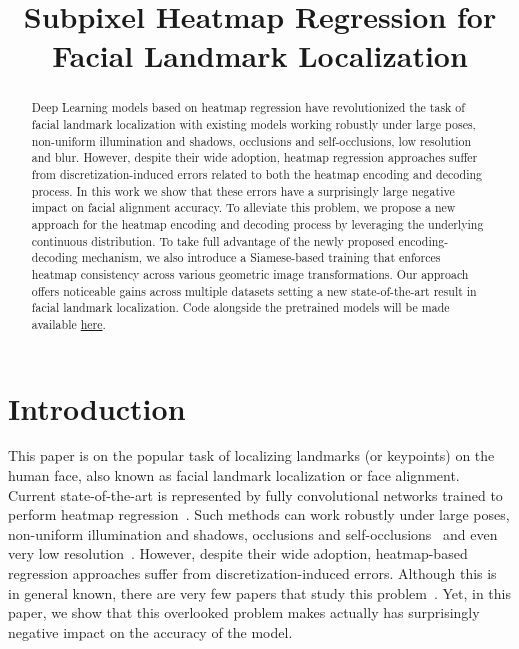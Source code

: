 \documentclass{bmvc2k}
\title{Subpixel Heatmap Regression for Facial Landmark Localization}
\begin{document}
\maketitle

\begin{abstract}
   
   Deep Learning models based on heatmap regression have revolutionized the task of facial landmark localization with existing models working robustly under large poses, non-uniform illumination and shadows, occlusions and self-occlusions, low resolution and blur. However, despite their wide adoption, heatmap regression approaches suffer from discretization-induced errors related to both the heatmap encoding and decoding process. In this work we show that these errors have a surprisingly large negative impact on facial alignment accuracy. To alleviate this problem, we propose a new approach for the heatmap encoding and decoding process by leveraging the underlying continuous distribution. To take full advantage of the newly proposed encoding-decoding mechanism, we also introduce a Siamese-based training that enforces heatmap consistency across various geometric image transformations. Our approach offers noticeable gains across multiple datasets setting a new state-of-the-art result in facial landmark localization. Code alongside the pretrained models will be made available \href{https://www.adrianbulat.com/face-alignment}{here}.
   
\end{abstract}

\section{Introduction}

This paper is on the popular task of localizing landmarks (or keypoints) on the human face, also known as facial landmark localization or face alignment. Current state-of-the-art is represented by fully convolutional networks trained to perform heatmap regression~\cite{bulat2017far,sun2019deep,kumar2020luvli,tang2019towards,feng2018wing,wang2020deep}. Such methods can work robustly under large poses, non-uniform illumination and shadows, occlusions and self-occlusions~\cite{bulat2016two,bulat2017far,sun2019high,kumar2020luvli} and even very low resolution~\cite{bulat2018super}. However, despite their wide adoption, heatmap-based regression approaches suffer from discretization-induced errors. Although this is in general known, there are very few papers that study this problem~\cite{wan2020robust, tai2019towards, luvizon20182d}. Yet, in this paper, we show that this overlooked problem makes actually has surprisingly negative impact on the accuracy of the model. 
\end{document}
